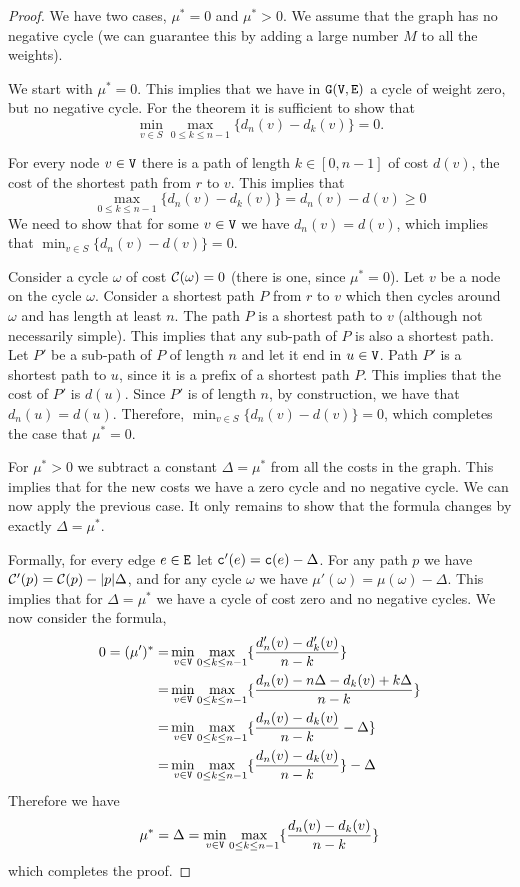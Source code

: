 \begin{proof}
We have two cases, $\mu^*=0$ and $\mu^*>0$. We assume that the graph
has no negative cycle (we can guarantee this by adding a large
number $M$ to all the weights).

We start with $\mu^*=0$. This implies that we have in ${\tt G}({\tt V},{\tt E})$ a
cycle of weight zero, but no negative cycle. For the theorem it is
sufficient to show that
\[
\min_{v\in S} \max_{0\leq k \leq n-1} \{d_n(v)-d_{k}(v)\}=0.
\]

For every node $v\in {\tt V}$ there is a path of length $k\in[0,n-1]$ of
cost $d(v)$, the cost of the shortest path from $r$ to $v$. This
implies that
\[
\max_{0\leq k \leq n-1} \{d_n(v)-d_{k}(v)\}=d_n(v)-d(v)\geq 0
\]
We need to show that for some $v\in {\tt V}$ we have $d_n(v)=d(v)$, which
implies that $\min_{v\in S} \{d_n(v)-d(v)\}=0$.

Consider a cycle $\omega$ of cost $\mathcal{C}(\omega)=0$ (there is one,
since $\mu^*=0$). Let $v$ be a node on the cycle $\omega$. Consider
a shortest path $P$ from $r$ to $v$ which then cycles around $\omega$ and has
length at least $n$. The path $P$ is a shortest path to $v$
(although not necessarily simple). This implies that any sub-path of
$P$ is also a shortest path. Let $P'$ be a sub-path of $P$ of length
$n$ and let it end in $u\in {\tt V}$.
%
Path $P'$ is a shortest path to $u$, since it is a prefix of a
shortest path $P$.
%
This implies that the cost of $P'$ is $d(u)$. Since $P'$ is of
length $n$, by construction, we have that $d_n(u)=d(u)$. Therefore,
$\min_{v\in S} \{d_n(v)-d(v)\}=0$, which completes the case that
$\mu^*=0$.

For $\mu^*>0$ we subtract a constant $\Delta=\mu^*$ from all the
costs in the graph. This implies that for the new costs we have a
zero cycle and no negative cycle. We can now apply the previous
case. It only remains to show that the formula changes by exactly
$\Delta=\mu^*$.

Formally, for every edge $e\in {\tt E}$ let ${\tt c}'(e)={\tt c}(e)-\Delta$.
For any path $p$ we have $\mathcal{C}'(p)=\mathcal{C}(p)-|p|\Delta$, and for any
cycle $\omega$ we have $\mu'(\omega)=\mu(\omega)-\Delta$. This
implies that for $\Delta=\mu^*$ we have a cycle of cost zero and no
negative cycles. We now consider the formula,
\begin{align*}
0=(\mu')^*=&\min_{v\in {\tt V}} \max_{0\leq k\leq n-1}
\{\frac{d'_n(v)-d'_{k}(v)}{n-k}\}\\
=&\min_{v\in {\tt V}} \max_{0\leq k\leq n-1}
\{\frac{d_n(v)-n\Delta-d_{k}(v)+k\Delta}{n-k}\}\\
=&\min_{v\in {\tt V}} \max_{0\leq k\leq n-1}
\{\frac{d_n(v)-d_{k}(v)}{n-k}-\Delta\}\\
=&\min_{v\in {\tt V}} \max_{0\leq k\leq n-1}
\{\frac{d_n(v)-d_{k}(v)}{n-k}\}-\Delta
\end{align*}
Therefore we have
\[
\mu^*=\Delta=\min_{v\in {\tt V}} \max_{0\leq k\leq n-1}
\{\frac{d_n(v)-d_{k}(v)}{n-k}\}   
\]
which completes the proof.
\end{proof}

